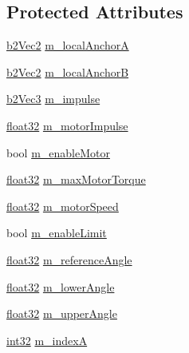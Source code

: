 \subsection*{Protected Attributes}
\begin{DoxyCompactItemize}
\item 
\mbox{\hyperlink{structb2_vec2}{b2\+Vec2}} \mbox{\hyperlink{classb2_revolute_joint_ad4ce801fa7bdd408b41310793e6b37f8}{m\+\_\+local\+AnchorA}}
\item 
\mbox{\hyperlink{structb2_vec2}{b2\+Vec2}} \mbox{\hyperlink{classb2_revolute_joint_ae206b6bcc7b6527d7d18f239d20a7ae9}{m\+\_\+local\+AnchorB}}
\item 
\mbox{\hyperlink{structb2_vec3}{b2\+Vec3}} \mbox{\hyperlink{classb2_revolute_joint_a00d576701b8e2ee886e9a59811b4df65}{m\+\_\+impulse}}
\item 
\mbox{\hyperlink{b2_settings_8h_aacdc525d6f7bddb3ae95d5c311bd06a1}{float32}} \mbox{\hyperlink{classb2_revolute_joint_a9275ac791803aa38c225d06b05ecfc26}{m\+\_\+motor\+Impulse}}
\item 
bool \mbox{\hyperlink{classb2_revolute_joint_a8fcdcbfc9fd51e8b5dc98ed8ea652e13}{m\+\_\+enable\+Motor}}
\item 
\mbox{\hyperlink{b2_settings_8h_aacdc525d6f7bddb3ae95d5c311bd06a1}{float32}} \mbox{\hyperlink{classb2_revolute_joint_a06ab30be0a455599bd3b5b6a11d6a43a}{m\+\_\+max\+Motor\+Torque}}
\item 
\mbox{\hyperlink{b2_settings_8h_aacdc525d6f7bddb3ae95d5c311bd06a1}{float32}} \mbox{\hyperlink{classb2_revolute_joint_a7b6f51d7aa4b0132b12ec1091fdebfca}{m\+\_\+motor\+Speed}}
\item 
bool \mbox{\hyperlink{classb2_revolute_joint_adb179e134ac49c612201caa20340e090}{m\+\_\+enable\+Limit}}
\item 
\mbox{\hyperlink{b2_settings_8h_aacdc525d6f7bddb3ae95d5c311bd06a1}{float32}} \mbox{\hyperlink{classb2_revolute_joint_a7648b770a9165ee9cd97edcf2df6ed9e}{m\+\_\+reference\+Angle}}
\item 
\mbox{\hyperlink{b2_settings_8h_aacdc525d6f7bddb3ae95d5c311bd06a1}{float32}} \mbox{\hyperlink{classb2_revolute_joint_a7c57732200aae93368481970731630b1}{m\+\_\+lower\+Angle}}
\item 
\mbox{\hyperlink{b2_settings_8h_aacdc525d6f7bddb3ae95d5c311bd06a1}{float32}} \mbox{\hyperlink{classb2_revolute_joint_adf7a2ab69e1e7a72697a2c9d92877c52}{m\+\_\+upper\+Angle}}
\item 
\mbox{\hyperlink{b2_settings_8h_a43d43196463bde49cb067f5c20ab8481}{int32}} \mbox{\hyperlink{classb2_revolute_joint_a2bdab138718ea7ccab67a37d0499286d}{m\+\_\+indexA}}

\end{DoxyCompactItemize}
